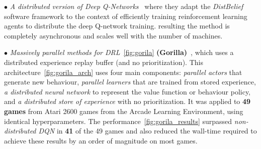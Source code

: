 $\bullet$ \textit{A distributed version of Deep Q-Networks}~\parencite{ong2015distributed} where they adapt the \textit{DistBelief} software framework to the context of efficiently
training reinforcement learning agents to distribute the deep Q-network training. resulting the method is completely asynchronous and scales well with the number of machines. 

$\bullet$ \textit{Massively parallel methods for DRL}~\ref{fig:gorila} \textbf{(Gorilla)}~\parencite{nair2015massively}, which uses a distributed experience replay buffer (and no prioritization). This architecture~\ref{fig:gorila_arch} uses four main components: \textit{parallel actors} that generate new behaviour, \textit{parallel learners} that are trained from stored experience, \textit{a distributed neural network} to represent the value function or behaviour policy, and \textit{a distributed store of experience} with no prioritization. It was applied to \textbf{49 games} from Atari 2600 games from the Arcade Learning Environment, using identical hyperparameters. The performance~\ref{fig:gorila_results} surpassed \textit{non-distributed DQN} in \textbf{41} of the 49 games and also reduced the wall-time required to achieve these results by an order of magnitude on most games.

